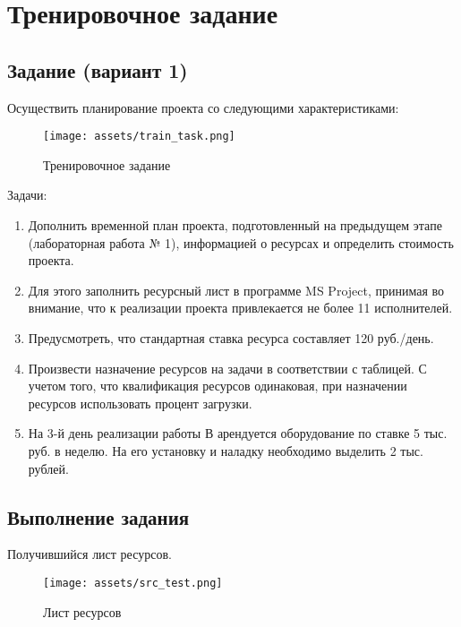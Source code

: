 \chapter{Тренировочное задание}

\section{Задание (вариант 1)}

Осуществить планирование проекта со следующими характеристиками:

\begin{figure}[H]
    \begin{center}
    \texttt{[image: assets/train\_task.png]}
    \caption{Тренировочное задание}
    \label{fig:1}
    \end{center}
\end{figure}

Задачи:

\begin{enumerate}
	\item Дополнить временной план проекта, подготовленный на предыдущем этапе (лабораторная работа № 1), информацией о ресурсах и определить стоимость проекта.
	\item Для этого заполнить ресурсный лист в программе MS Project, принимая во внимание, что к реализации проекта привлекается не более 11 исполнителей.
	\item Предусмотреть, что стандартная ставка ресурса составляет 120 руб./день.
	\item Произвести назначение ресурсов на задачи в соответствии с таблицей. С учетом того, что квалификация ресурсов одинаковая, при назначении ресурсов использовать процент загрузки.
	\item На 3-й день реализации работы В арендуется оборудование по ставке 5 тыс. руб. в неделю. На его установку и наладку необходимо выделить 2 тыс. рублей.
\end{enumerate}

\section{Выполнение задания}

Получившийся лист ресурсов.

\begin{figure}[H]
    \begin{center}
    \texttt{[image: assets/src\_test.png]}
    \caption{Лист ресурсов}
    \label{fig:2}
    \end{center}
\end{figure}

